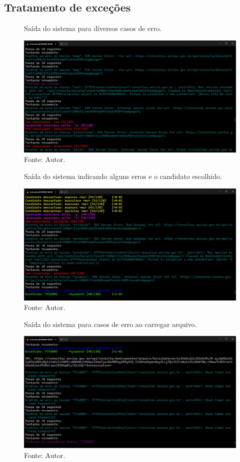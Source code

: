 \subsection{Tratamento de exceções}
\begin{frame}
    \begin{figure}
        \centering
        \caption*{Saída do sistema para diversos casos de erro.}
        \includegraphics[height=0.72\textheight]{../pictures/terminal tysabri try.jpg}
        \caption*{Fonte: Autor.}
    \end{figure}
\end{frame}

\begin{frame}
	\begin{figure}
		\centering
		\caption*{Saída do sistema indicando alguns erros e o candidato escolhido.}
		\includegraphics[height=0.72\textheight]{../pictures/terminal tysabri escolhido.jpg}
		\caption*{Fonte: Autor.}
	\end{figure}
\end{frame}

\begin{frame}
    \begin{figure}
        \centering
        \caption*{Saída do sistema para casos de erro ao carregar arquivo.}
        \includegraphics[height=0.72\textheight]{../pictures/terminal tysabri carregar erro.jpg}
        \caption*{Fonte: Autor.}
    \end{figure}
\end{frame}

